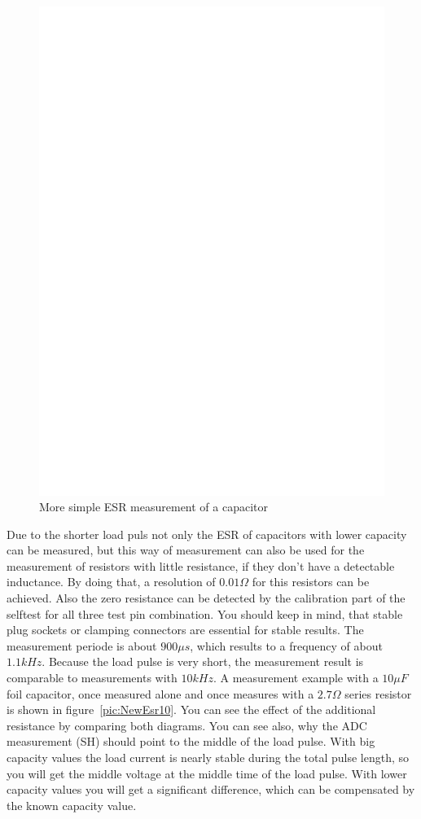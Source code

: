 \begin{figure}[H]
  \centering
    \includegraphics[]{../FIG/Cap_esr2.eps}
  \caption{More simple ESR measurement of a capacitor}
  \label{fig:Cap_esr2}
\end{figure}


Due to the shorter load puls not only the ESR of capacitors with lower capacity can be measured, but this
way of measurement can also be used for the measurement of resistors with little resistance, if they don't
have a detectable inductance. By doing that, a resolution of \(0.01\Omega\) for this resistors can be achieved.
Also the zero resistance can be detected by the calibration part of the selftest for all three test pin combination.
You should keep in mind, that stable plug sockets or clamping connectors are essential for stable results.
The measurement periode is about \(900\mu s\), which results to a frequency of about \(1.1kHz\).
Because the load pulse is very short, the measurement result is comparable to measurements with \(10kHz\).
A measurement example with a \(10\mu F\) foil capacitor, once measured alone and once measures with a \(2.7\Omega\)
series resistor is shown in figure~\ref{pic:NewEsr10}.
You can see the effect of the additional resistance by comparing both diagrams.
You can see also, why the ADC measurement (SH) should point to the middle of the load pulse.
With big capacity values the load current is nearly stable during the total pulse length,
so you will get the middle voltage at the middle time of the load pulse. 
With lower capacity values you will get a significant difference, which can be compensated by the
known capacity value.

